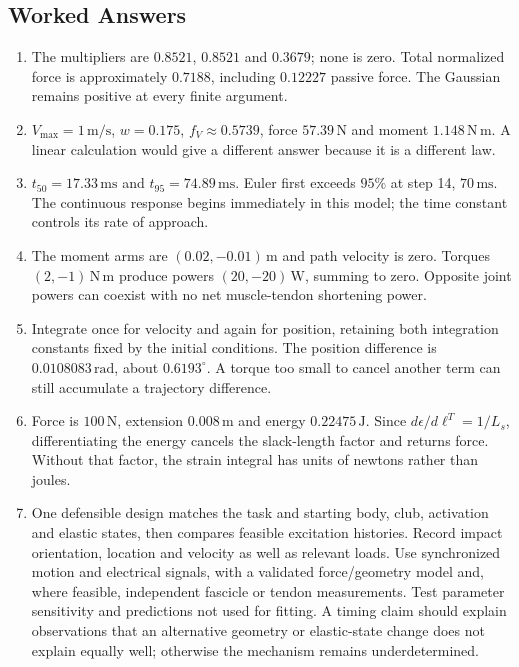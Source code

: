\subsection{Worked Answers}
\begin{enumerate}
\item The multipliers are $0.8521$, $0.8521$ and $0.3679$; none is zero. Total normalized force is approximately $0.7188$, including $0.12227$ passive force. The Gaussian remains positive at every finite argument.
\item $V_{\max}=1\,\mathrm{m/s}$, $w=0.175$, $f_V\approx0.5739$, force $57.39\,\mathrm{N}$ and moment $1.148\,\mathrm{N\,m}$. A linear calculation would give a different answer because it is a different law.
\item $t_{50}=17.33\,\mathrm{ms}$ and $t_{95}=74.89\,\mathrm{ms}$. Euler first exceeds $95\%$ at step 14, $70\,\mathrm{ms}$. The continuous response begins immediately in this model; the time constant controls its rate of approach.
\item The moment arms are $(0.02,-0.01)\,\mathrm{m}$ and path velocity is zero. Torques $(2,-1)\,\mathrm{N\,m}$ produce powers $(20,-20)\,\mathrm{W}$, summing to zero. Opposite joint powers can coexist with no net muscle-tendon shortening power.
\item Integrate once for velocity and again for position, retaining both integration constants fixed by the initial conditions. The position difference is $0.0108083\,\mathrm{rad}$, about $0.6193^\circ$. A torque too small to cancel another term can still accumulate a trajectory difference.
\item Force is $100\,\mathrm{N}$, extension $0.008\,\mathrm{m}$ and energy $0.22475\,\mathrm{J}$. Since $d\epsilon/d\ell^T=1/L_s$, differentiating the energy cancels the slack-length factor and returns force. Without that factor, the strain integral has units of newtons rather than joules.
\item One defensible design matches the task and starting body, club, activation and elastic states, then compares feasible excitation histories. Record impact orientation, location and velocity as well as relevant loads. Use synchronized motion and electrical signals, with a validated force/geometry model and, where feasible, independent fascicle or tendon measurements. Test parameter sensitivity and predictions not used for fitting. A timing claim should explain observations that an alternative geometry or elastic-state change does not explain equally well; otherwise the mechanism remains underdetermined.
\end{enumerate}
\clearpage
\flushbottom{}
